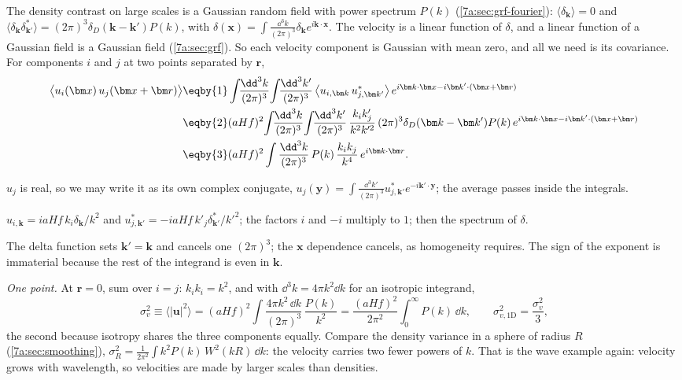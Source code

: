 The density contrast on large scales is a Gaussian random field with power spectrum
$P(k)$ (\cref{7a:sec:grf-fourier}): $\langle\delta_{\bm k}\rangle=0$ and
$\langle\delta_{\bm k}\delta^*_{\bm k'}\rangle=(2\pi)^3\delta_D(\bm k-\bm k')P(k)$, with
$\delta(\bm x)=\int\frac{\dd^3k}{(2\pi)^3}\delta_{\bm k}e^{i\bm k\cdot\bm x}$. The
velocity is a linear function of $\delta$, and a linear function of a Gaussian
field is a Gaussian field (\cref{7a:sec:grf}). So each velocity component is
Gaussian with mean zero, and all we need is its covariance. For components $i$
and $j$ at two points separated by $\bm r$,
\begin{align}
  \bigl\langle u_i(\bm x)\,u_j(\bm x+\bm r)\bigr\rangle
  &\eqby{1}\int\!\!\frac{\dd^3k}{(2\pi)^3}\!\int\!\!\frac{\dd^3k'}{(2\pi)^3}\,
   \bigl\langle u_{i,\bm k}\,u^*_{j,\bm k'}\bigr\rangle\,
   e^{i\bm k\cdot\bm x-i\bm k'\cdot(\bm x+\bm r)}
  \nonumber\\
  &\eqby{2}(aHf)^2\!\int\!\!\frac{\dd^3k}{(2\pi)^3}\!\int\!\!\frac{\dd^3k'}{(2\pi)^3}\,
   \frac{k_ik'_j}{k^2k'^2}\,(2\pi)^3\delta_D(\bm k-\bm k')P(k)\,
   e^{i\bm k\cdot\bm x-i\bm k'\cdot(\bm x+\bm r)}
  \nonumber\\
  &\eqby{3}(aHf)^2\int\frac{\dd^3k}{(2\pi)^3}\,P(k)\,\frac{k_ik_j}{k^4}\,e^{i\bm k\cdot\bm r}.
  \label{11c:eq:vel-cov}
\end{align}
\begin{explain}
  \item $u_j$ is real, so we may write it as its own complex conjugate,
        $u_j(\bm y)=\int\frac{\dd^3k'}{(2\pi)^3}u^*_{j,\bm k'}e^{-i\bm k'\cdot\bm y}$;
        the average passes inside the integrals.
  \item $u_{i,\bm k}=iaHf\,k_i\delta_{\bm k}/k^2$ and
        $u^*_{j,\bm k'}=-iaHf\,k'_j\delta^*_{\bm k'}/k'^2$; the factors $i$ and $-i$
        multiply to $1$; then the spectrum of $\delta$.
  \item The delta function sets $\bm k'=\bm k$ and cancels one $(2\pi)^3$; the
        $\bm x$ dependence cancels, as homogeneity requires. The sign of the exponent
        is immaterial because the rest of the integrand is even in $\bm k$.
\end{explain}

\emph{One point.} At $\bm r=0$, sum over $i=j$: $k_ik_i=k^2$, and with
$\dd^3k=4\pi k^2\dd k$ for an isotropic integrand,
\begin{equation}
  \sigma_v^2\equiv\bigl\langle|\bm u|^2\bigr\rangle
  =(aHf)^2\int\frac{4\pi k^2\,\dd k}{(2\pi)^3}\,\frac{P(k)}{k^2}
  =\frac{(aHf)^2}{2\pi^2}\int_0^\infty P(k)\,\dd k ,
  \qquad
  \sigma_{v,1\mathrm D}^2=\frac{\sigma_v^2}{3},
  \label{11c:eq:sigma-v}
\end{equation}
the second because isotropy shares the three components equally. Compare the
density variance in a sphere of radius $R$ (\cref{7a:sec:smoothing}),
$\sigma_R^2=\frac{1}{2\pi^2}\int k^2P(k)\,W^2(kR)\,\dd k$: the velocity carries two
fewer powers of $k$. That is the wave example again: velocity grows with
wavelength, so velocities are made by larger scales than densities.

